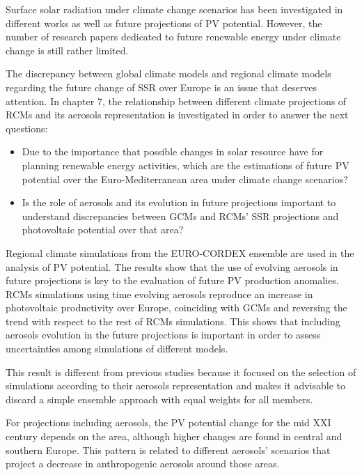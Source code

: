 Surface solar radiation under climate change scenarios has been investigated in different works as well as future projections of PV potential. However, the number of research papers dedicated to future renewable energy under climate change is still rather limited.

The discrepancy between global climate models and regional climate models regarding the future change of SSR over Europe is an issue that deserves attention. In chapter 7, the relationship between different climate projections of RCMs and its aerosols representation is investigated in order to answer the next questions:

\begin{itemize}
\item Due to the importance that possible changes in solar resource have for planning renewable energy activities, which are the estimations of future PV potential over the Euro-Mediterranean area under climate change scenarios?
\item Is the role of aerosols and its evolution in future projections important to understand discrepancies between GCMs and RCMs' SSR projections and photovoltaic potential over that area?

\end{itemize}

  Regional climate simulations from the EURO-CORDEX ensemble are used in the analysis of PV potential. The results show that the use of evolving aerosols in future projections is key to the evaluation of future PV production anomalies. RCMs simulations using time evolving aerosols reproduce an increase in photovoltaic productivity over Europe, coinciding with GCMs and reversing the trend with respect to the rest of RCMs simulations. This shows that including aerosols evolution in the future projections is important in order to assess uncertainties among simulations of different models. 

  This result is different from previous studies because it focused on the selection of simulations according to their aerosols representation and makes it advisable to discard a simple ensemble approach with equal weights for all members.
  
  For projections including aerosols, the PV potential change for the mid XXI century depends on the area, although higher changes are found in central and southern Europe. This pattern is related to different aerosols' scenarios that project a decrease in anthropogenic aerosols around those areas.

